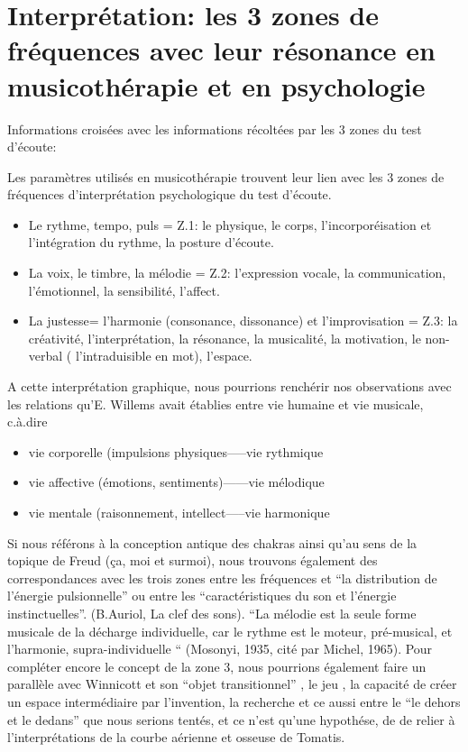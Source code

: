 \section{Interprétation: les 3 zones de fréquences avec leur résonance en musicothérapie et en
  psychologie}


	Informations croisées avec les informations récoltées par les 3 
          zones du test d'écoute:
          
Les paramètres utilisés en musicothérapie trouvent leur lien avec les
3 zones de fréquences d'interprétation psychologique du test d'écoute.
\begin{itemize}
 \item Le rythme, tempo, puls  =  Z.1: le physique, le corps, l'incorporéisation et
l'intégration du rythme,
la posture d'écoute.

\item La voix, le timbre, la mélodie =  Z.2:  l'expression vocale, la communication,
l'émotionnel, la sensibilité, l'affect.

\item La justesse= l'harmonie (consonance, dissonance) et l'improvisation = Z.3:  la créativité, l'interprétation, la
résonance, la musicalité, la motivation, le non-verbal (
l'intraduisible en mot), l'espace.
\end{itemize}
A cette interprétation graphique, nous pourrions renchérir nos
observations avec les relations
qu'E.
Willems  avait établies entre vie humaine et vie musicale, c.à.dire
\begin{itemize}
  \item vie corporelle (impulsions physiques-----vie rythmique
  \item vie affective (émotions, sentiments)------vie mélodique
    \item vie mentale (raisonnement, intellect-----vie harmonique
\end{itemize}

Si nous référons à la conception antique des chakras ainsi qu'au sens de la
topique de Freud (ça, moi et surmoi), nous trouvons également des correspondances
avec les trois zones entre les
fréquences et ``la distribution de l'énergie pulsionnelle'' ou entre
les 
``caractéristiques du son et l'énergie instinctuelles''. (B.Auriol, La
clef des sons).
``La mélodie est la seule forme musicale de la décharge individuelle, car le rythme est le moteur, pré-musical, et l'harmonie, supra-individuelle `` (Mosonyi, 1935, cité par Michel, 1965).
Pour compléter encore le concept de la zone 3, nous pourrions
également faire un parallèle avec Winnicott et son ``objet
transitionnel'' , le jeu , la capacité de créer un espace
intermédiaire par l'invention, la recherche et ce aussi entre le ``le
dehors et le dedans'' que nous serions tentés, et ce n'est qu'une
hypothése, de de relier à l'interprétations de la courbe aérienne et osseuse de Tomatis. 
 

